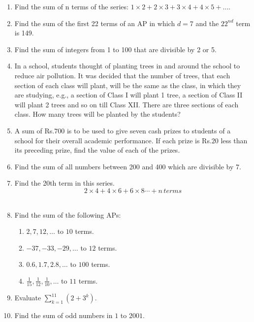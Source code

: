 \begin{enumerate}[label=\thechapter.\arabic*,ref=\thechapter.\theenumi]
\item Find the sum of n terms of the series:
$1\times2+2\times3+3\times4+4\times5+....$\\
\solution
\pagebreak
\item Find the sum of the first 22 terms of an AP in which $d = 7$ and the $22^{nd}$ term is 149.\\
\solution

\pagebreak

\item Find the sum of integers from 1 to 100 that are divisible by 2 or 5.\\
\solution

\pagebreak

\item In a school, students thought of planting trees in and around the school to reduce air pollution. It was decided that the number of trees, that each section of each class will plant, will be the same as the class, in which they are studying, e.g., a section of Class I will plant 1 tree, a section of Class II will plant 2 trees and so on till Class XII. There are three sections of each class. How many trees will be planted by the students?\\
\solution

\pagebreak
\item A sum of Rs.$700$ is to be used to give seven cash prizes to students of a school for their overall academic performance. If each prize is Rs.$20$ less than its preceding prize, find the value of each of the prizes. \\
\solution

\pagebreak

\item Find the sum of all numbers between 200 and 400 which are divisible by 7.\\
\solution

\pagebreak

\item Find the 20th term in this series.\\
$$2\times4+4\times6+6\times8\cdots+n\,terms$$ \\
\solution 

\pagebreak

\item Find the sum of the following APs:
\begin{enumerate}[label=(\alph*)]
\item $2, 7, 12, \ldots$ to $10$ terms.
\item $-37, -33, -29, \ldots$ to $12$ terms.
\item $0.6, 1.7, 2.8, \ldots$ to $100$ terms.
\item $\frac{1}{15}, \frac{1}{12}, \frac{1}{10}, \ldots$ to $11$ terms.
\end{enumerate}
\solution

\pagebreak

\item Evaluate $\sum_{k=1}^{11} (2 + 3^k)$.
\solution

\pagebreak
\item Find the sum of odd numbers in $1$ to $2001$.
\solution

\pagebreak
\end{enumerate}
